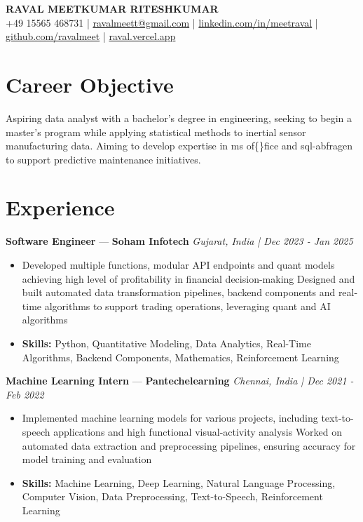 \documentclass[a4paper,10pt]{article}
\begin{document}
\begin{center}
  {\Large\bfseries RAVAL MEETKUMAR RITESHKUMAR}\\[2pt]
  {\small +49 15565 468731 \;|\; \href{mailto:ravalmeett@gmail.com}{ravalmeett@gmail.com} \;|\; \href{https://www.linkedin.com/in/meetraval/}{linkedin.com/in/meetraval} \;|\; \href{https://github.com/ravalmeet}{github.com/ravalmeet} \;|\; \href{https://raval.vercel.app/}{raval.vercel.app}}
\end{center}
\vspace{-3pt}

\section*{Career Objective}
Aspiring data analyst with a bachelor's degree in engineering, seeking to begin a master's program while applying statistical methods to inertial sensor manufacturing data. Aiming to develop expertise in ms of\{\}fice and sql-abfragen to support predictive maintenance initiatives.\par

\section*{Experience}
\textbf{Software Engineer} — \textbf{Soham Infotech} \hfill \textit{Gujarat, India \;|\; Dec 2023 - Jan 2025}\par
\vspace{1pt}
\begin{itemize}
  \item Developed multiple functions, modular API endpoints and quant models achieving high level of profitability in financial decision-making Designed and built automated data transformation pipelines, backend components and real-time algorithms to support trading operations, leveraging quant and AI algorithms
  \item \textbf{Skills:} Python, Quantitative Modeling, Data Analytics, Real-Time Algorithms, Backend Components, Mathematics, Reinforcement Learning
\end{itemize}
\vspace{3pt}
\textbf{Machine Learning Intern} — \textbf{Pantechelearning} \hfill \textit{Chennai, India \;|\; Dec 2021 - Feb 2022}\par
\vspace{1pt}
\begin{itemize}
  \item Implemented machine learning models for various projects, including text-to-speech applications and high functional visual-activity analysis Worked on automated data extraction and preprocessing pipelines, ensuring accuracy for model training and evaluation
  \item \textbf{Skills:} Machine Learning, Deep Learning, Natural Language Processing, Computer Vision, Data Preprocessing, Text-to-Speech, Reinforcement Learning
\end{itemize}
\end{document}
